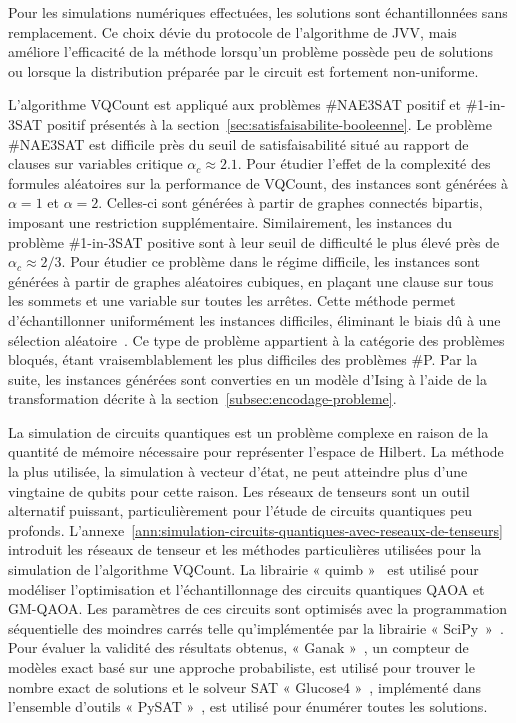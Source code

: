 Pour les simulations numériques effectuées, les solutions sont échantillonnées sans remplacement. Ce choix dévie du protocole de l'algorithme de JVV, mais améliore l'efficacité de la méthode lorsqu'un problème possède peu de solutions ou lorsque la distribution préparée par le circuit est fortement non-uniforme.

L'algorithme VQCount est appliqué aux problèmes \#NAE3SAT positif et \#1-in-3SAT positif présentés à la section~\ref{sec:satisfaisabilite-booleenne}. Le problème \#NAE3SAT est difficile près du seuil de satisfaisabilité situé au rapport de clauses sur variables critique $\alpha_{c} \approx 2.1$. Pour étudier l'effet de la complexité des formules aléatoires sur la performance de VQCount, des instances sont générées à $\alpha = 1$ et $\alpha = 2$. Celles-ci sont générées à partir de graphes connectés bipartis, imposant une restriction supplémentaire. Similairement, les instances du problème \#1-in-3SAT positive sont à leur seuil de difficulté le plus élevé près de $\alpha_{c} \approx 2/3$. Pour étudier ce problème dans le régime difficile, les instances sont générées à partir de graphes aléatoires cubiques, en plaçant une clause sur tous les sommets et une variable sur toutes les arrêtes. Cette méthode permet d'échantillonner uniformément les instances difficiles, éliminant le biais dû à une sélection aléatoire~\cite{vigerEfficientSimpleGeneration2005}. Ce type de problème appartient à la catégorie des problèmes bloqués, étant vraisemblablement les plus difficiles des problèmes \textsf{\#P}. Par la suite, les instances générées sont converties en un modèle d'Ising à l'aide de la transformation décrite à la section~\ref{subsec:encodage-probleme}.

La simulation de circuits quantiques est un problème complexe en raison de la quantité de mémoire nécessaire pour représenter l'espace de Hilbert. La méthode la plus utilisée, la simulation à vecteur d'état, ne peut atteindre plus d'une vingtaine de qubits pour cette raison. Les réseaux de tenseurs sont un outil alternatif puissant, particulièrement pour l'étude de circuits quantiques peu profonds. L'annexe~\ref{ann:simulation-circuits-quantiques-avec-reseaux-de-tenseurs} introduit les réseaux de tenseur et les méthodes particulières utilisées pour la simulation de l'algorithme VQCount. La librairie « quimb »~\cite{grayQuimbPythonPackage2018} est utilisé pour modéliser l'optimisation et l'échantillonnage des circuits quantiques QAOA et GM-QAOA. Les paramètres de ces circuits sont optimisés avec la programmation séquentielle des moindres carrés telle qu'implémentée par la librairie « SciPy »~\cite{virtanenSciPy10Fundamental2020}. Pour évaluer la validité des résultats obtenus, « Ganak »~\cite{sharmaGANAKScalableProbabilistic2019}, un compteur de modèles exact basé sur une approche probabiliste, est utilisé pour trouver le nombre exact de solutions et le solveur SAT « Glucose4 »~\cite{eenExtensibleSATsolver2004,audemardPredictingLearntClauses2009}, implémenté dans l'ensemble d'outils « PySAT »~\cite{ignatievPySATPythonToolkit2018}, est utilisé pour énumérer toutes les solutions.

